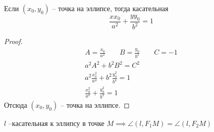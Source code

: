 \documentclass[main]{subfiles}
\begin{document}
\begin{theorem}
    Если $(x_0, y_0)$  -- точка на эллипсе, тогда касательная
    \[\frac{xx_0}{a^2} + \frac{yy_0}{b^2}=1\]
\end{theorem}
\begin{proof}
    \begin{gather*}
        A = \frac{x_0}{a^2} \qquad B = \frac{y_0}{b^2} \qquad C = -1\\
        a^2 A^2 + b^2B^2 = C^2\\
        a^2 \frac{x_0^2}{a^4} + b^2 \frac{y_0^2}{b^4} = 1\\
        \frac{x_0^2}{a^2} + \frac{y_0^2}{b^2} = 1
    \end{gather*}
    Отсюда $(x_0, y_0)$ -- точка на эллипсе.
\end{proof}

\begin{theorem}
    $l$ --касательная к эллипсу в точке $M \implies \angle(l, F_1M) = \angle(l, F_2M)$
\end{theorem}
\end{document}
